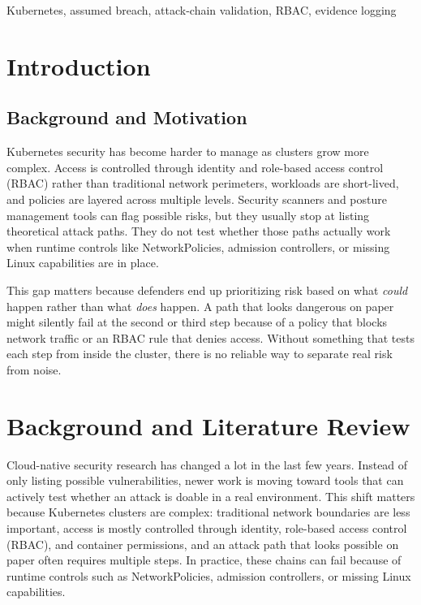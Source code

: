 \documentclass[conference]{IEEEtran}
\begin{document}
\begin{IEEEkeywords}
Kubernetes, assumed breach, attack-chain validation, RBAC, evidence logging
\end{IEEEkeywords}

\section{Introduction}

\subsection{Background and Motivation}
Kubernetes security has become harder to manage as clusters grow more complex. Access is controlled through identity and role-based access control (RBAC) rather than traditional network perimeters, workloads are short-lived, and policies are layered across multiple levels. Security scanners and posture management tools can flag possible risks, but they usually stop at listing theoretical attack paths. They do not test whether those paths actually work when runtime controls like NetworkPolicies, admission controllers, or missing Linux capabilities are in place.

This gap matters because defenders end up prioritizing risk based on what \emph{could} happen rather than what \emph{does} happen. A path that looks dangerous on paper might silently fail at the second or third step because of a policy that blocks network traffic or an RBAC rule that denies access. Without something that tests each step from inside the cluster, there is no reliable way to separate real risk from noise.

\section{Background and Literature Review}

Cloud-native security research has changed a lot in the last few years. Instead of only listing possible vulnerabilities, newer work is moving toward tools that can actively test whether an attack is doable in a real environment. This shift matters because Kubernetes clusters are complex: traditional network boundaries are less important, access is mostly controlled through identity, role-based access control (RBAC), and container permissions, and an attack path that looks possible on paper often requires multiple steps. In practice, these chains can fail because of runtime controls such as NetworkPolicies, admission controllers, or missing Linux capabilities.
\end{document}
